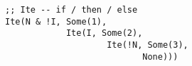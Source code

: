 \begin{lstlisting}[style=scalaioScala]
;; Ite -- if / then / else
Ite(N & !I, Some(1),
            Ite(I, Some(2),
                    Ite(!N, Some(3),
                           None)))
\end{lstlisting}
